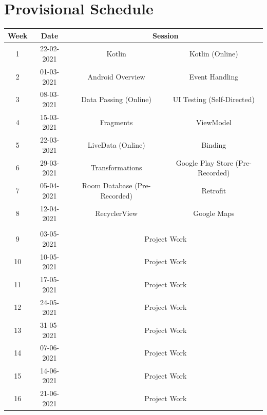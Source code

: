 \documentclass{article}
\begin{document}
\section*{Provisional Schedule}
\renewcommand{\arraystretch}{1.5}
\begin{tabular}{|c|c|c|c|}
	\hline
	\textbf{Week} & \textbf{Date}     & \multicolumn{2}{c|}{\textbf{Session}}          \\ \hline
	\small 1 & \small 22-02-2021 & Kotlin            						& Kotlin (Online)									\\ \hline
	\small 2 & \small 01-03-2021 & Android Overview             & Event Handling \\ \hline
	\small 3 & \small 08-03-2021 & Data Passing (Online)        & UI Testing (Self-Directed)     \\ \hline
	\small 4 & \small 15-03-2021 & Fragments                    & ViewModel      \\ \hline
	\small 5 & \small 22-03-2021 & LiveData (Online)            & Binding   \\ \hline
	\small 6 & \small 29-03-2021 & Transformations     & Google Play Store (Pre-Recorded)        \\ \hline
	\small 7 & \small 05-04-2021 & Room Database (Pre-Recorded) & Retrofit       \\ \hline
	\small 8 & \small 12-04-2021 & RecyclerView                 & Google Maps    \\ \hline
	\rowcolor{yellow} \multicolumn{4}{|c|}{\small Mid Term Break}  \\ \hline
	\small 9 & \small 03-05-2021 & \multicolumn{2}{c|}{\small Project Work}       \\ \hline
	\small 10     & \small 10-05-2021 & \multicolumn{2}{c|}{\small Project Work}        \\ \hline
	\small 11     & \small 17-05-2021 & \multicolumn{2}{c|}{\small Project Work}       \\ \hline
	\small 12     & \small 24-05-2021 & \multicolumn{2}{c|}{\small Project Work}       \\ \hline
	\small 13     & \small 31-05-2021 & \multicolumn{2}{c|}{\small Project Work}       \\ \hline
	\small 14     & \small 07-06-2021 & \multicolumn{2}{c|}{\small Project Work}       \\ \hline
	\small 15     & \small 14-06-2021 & \multicolumn{2}{c|}{\small Project Work}       \\ \hline
	\small 16     & \small 21-06-2021 & \multicolumn{2}{c|}{\small Project Work}       \\ \hline
\end{tabular}
\end{document}
